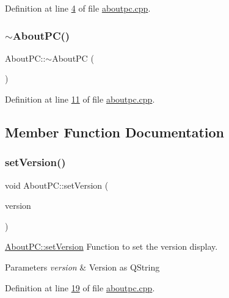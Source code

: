Definition at line \mbox{\hyperlink{aboutpc_8cpp_source_l00004}{4}} of file \mbox{\hyperlink{aboutpc_8cpp_source}{aboutpc.\+cpp}}.

\mbox{\label{class_about_p_c_a3cc0c4c81abc640d946003b078a47dd4}} 
\subsubsection{\texorpdfstring{$\sim$\+About\+P\+C()}{~AboutPC()}}
{\footnotesize\ttfamily About\+P\+C\+::$\sim$\+About\+PC (\begin{DoxyParamCaption}{ }\end{DoxyParamCaption})}



Definition at line \mbox{\hyperlink{aboutpc_8cpp_source_l00011}{11}} of file \mbox{\hyperlink{aboutpc_8cpp_source}{aboutpc.\+cpp}}.



\subsection{Member Function Documentation}
\mbox{\label{class_about_p_c_aa3815d4826d0c8d87122449537a0a4d5}} 
\subsubsection{\texorpdfstring{set\+Version()}{setVersion()}}
{\footnotesize\ttfamily void About\+P\+C\+::set\+Version (\begin{DoxyParamCaption}\item[{Q\+String}]{version }\end{DoxyParamCaption})}



\mbox{\hyperlink{class_about_p_c_aa3815d4826d0c8d87122449537a0a4d5}{About\+P\+C\+::set\+Version}} Function to set the version display. 


\begin{DoxyParams}{Parameters}
{\em version} & Version as Q\+String \\
\hline
\end{DoxyParams}


Definition at line \mbox{\hyperlink{aboutpc_8cpp_source_l00019}{19}} of file \mbox{\hyperlink{aboutpc_8cpp_source}{aboutpc.\+cpp}}.

